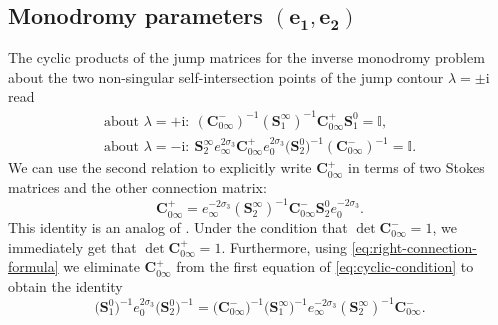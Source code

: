 \documentclass[11pt]{article}
\numberwithin{equation}{section}
\numberwithin{equation}{section}
\newcommand{\ii}{\mathrm{i}}
\begin{document}
\subsection[Monodromy parameters (e\_1, e\_2)]{Monodromy parameters $\boldsymbol{(e_1, e_2)}$}\label{subsec:cyclic}
The cyclic products of the jump matrices for the inverse monodromy problem about the two non-singular self-intersection points of the jump contour $\lambda=\pm\ii$ read
 \begin{gather}
 \text{about } \lambda=+\ii \colon\ (\mathbf{C}_{0\infty}^-)^{-1}(\mathbf{S}^\infty_{1})^{-1}\mathbf{C}_{0\infty}^+\mathbf{S}^0_{1}=\mathbb{I},\nonumber\\
 \text{about } \lambda=-\ii\colon\
 \mathbf{S}_{2}^\infty e_\infty^{2\sigma_3}\mathbf{C}_{0\infty}^+e_0^{2\sigma_3}\big(\mathbf{S}^0_{2}\big)^{-1}(\mathbf{C}_{0\infty}^-)^{-1}=\mathbb{I}.
 \label{eq:cyclic-condition}
 \end{gather}
 We can use the second relation to explicitly write $\mathbf{C}_{0\infty}^+$ in terms of two Stokes matrices and the other connection matrix:
 \begin{equation} \mathbf{C}_{0\infty}^+=e_\infty^{-2\sigma_3}(\mathbf{S}_{2}^\infty )^{-1}\mathbf{C}_{0\infty}^-\mathbf{S}^0_{2}e_0^{-2\sigma_3}.
 \label{eq:right-connection-formula}
 \end{equation}
This identity is an analog of \cite[equation~(3.17)]{Jimbo}.
 Under the condition that $\det \mathbf{C}_{0\infty}^- = 1$, we immediately get that $\det \mathbf{C}_{0\infty}^+ = 1$. Furthermore, using \eqref{eq:right-connection-formula} we eliminate $\mathbf{C}_{0\infty}^+$ from the first equation of \eqref{eq:cyclic-condition} to obtain the identity
 \begin{equation}
 \big(\mathbf{S}^0_{1}\big)^{-1}e_0^{2\sigma_3}\big(\mathbf{S}_{2}^0 \big)^{-1} = \big(\mathbf{C}_{0\infty}^-\big)^{-1}\big(\mathbf{S}^\infty_{1}\big)^{-1}e_\infty^{-2\sigma_3}(\mathbf{S}_{2}^\infty )^{-1}\mathbf{C}_{0\infty}^-.
 \label{eq:left-connection-identity}
 \end{equation}
\end{document}
